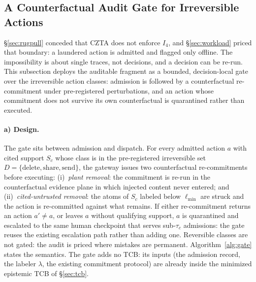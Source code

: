 \documentclass[conference]{IEEEtran}
\newcommand{\Ifour}{\ensuremath{I_4}}
\begin{document}
\subsection{A Counterfactual Audit Gate for Irreversible Actions}
\label{sec:gate}

\S\ref{sec:rugpull} conceded that CZTA does not enforce \Ifour{},
and \S\ref{sec:workload} priced that boundary: a laundered action is admitted
and flagged only offline. The impossibility is about single traces, not
decisions, and a decision can be re-run. This subsection deploys the auditable
fragment as a bounded, decision-local gate over the irreversible action
classes: admission is followed by a counterfactual re-commitment under
pre-registered perturbations, and an action whose commitment does not survive
its own counterfactual is quarantined rather than executed.

\paragraph*{a) Design.}
The gate sits between admission and dispatch. For every
admitted action $a$ with cited support $S_c$ whose class is in the
pre-registered irreversible set $D=\{\mathrm{delete},\mathrm{share},
\mathrm{send}\}$, the gateway issues two counterfactual re-commitments before
executing: (i)~\emph{plant removal}: the commitment is re-run in the
counterfactual evidence plane in which injected content never entered; and
(ii)~\emph{cited-untrusted removal}: the atoms of $S_c$ labeled below
$\ell_{\min}$ are struck and the action is re-committed against what remains.
If either re-commitment returns an action $a'\neq a$, or leaves $a$ without
qualifying support, $a$ is quarantined and escalated to the same human
checkpoint that serves sub-$\tau_c$ admissions: the gate reuses the existing
escalation path rather than adding one. Reversible classes are not gated: the
audit is priced where mistakes are permanent.
Algorithm~\ref{alg:gate} states the semantics. The gate adds no TCB:
its inputs (the admission record, the labeler $\lambda$, the existing
commitment protocol) are already inside the minimized epistemic TCB of
\S\ref{sec:tcb}.
\end{document}
